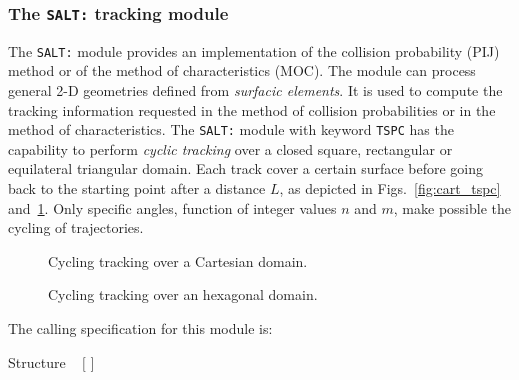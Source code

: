 \subsubsection{The {\tt SALT:} tracking module}\label{sect:SALTData1}

The {\tt SALT:} module provides an implementation of the collision probability (PIJ) method or of the method of characteristics (MOC).
The  module can process general 2-D geometries defined from {\sl surfacic elements}. It is used to compute the tracking
information requested in the method of collision probabilities or in the method of characteristics. The {\tt SALT:} module with keyword
{\tt TSPC} has the capability to perform {\sl cyclic tracking} over a closed square, rectangular
or equilateral triangular domain. Each track cover a certain surface before going back to the starting point after a distance $L$, as
depicted in Figs.~\ref{fig:cart_tspc} and~\ref{fig:hex_tspc}. Only specific angles, function of integer values $n$ and $m$, make
possible the cycling of trajectories.

\begin{figure}[h!]
\begin{center} 
\epsfxsize=9cm \centerline{ }
\parbox{14.0cm}{\caption{Cycling tracking over a Cartesian domain.}\label{fig:cart_tspc}}

\epsfxsize=14cm \centerline{ }
\parbox{14.0cm}{\caption{Cycling tracking over an hexagonal domain.}\label{fig:hex_tspc}}
\end{center}  
\end{figure}

\clearpage

The calling specification for this module is:
\begin{DataStructure}{Structure }
 
\moc{:=} ~ $[$  $]$ \moc{::}  
\end{DataStructure}

